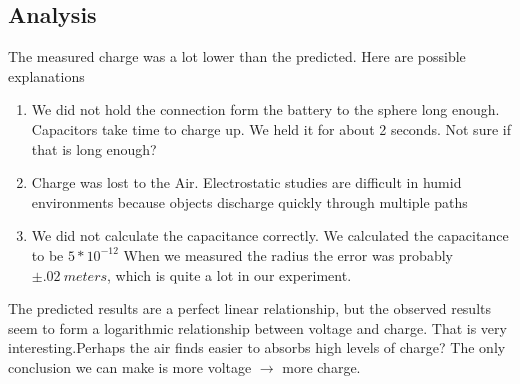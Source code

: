 \documentclass[12pt]{article}
\begin{document}
\subsection*{Analysis}
The measured charge was a lot lower than the predicted. Here are possible explanations
\begin{enumerate}
	\item 
	We did not hold the connection form the battery to the sphere long enough. Capacitors take time to charge up. We held it for about 2 seconds. Not sure if that is long enough?
	\item Charge was lost to the Air. Electrostatic studies are difficult in humid environments because objects discharge quickly through multiple paths 
	\item We did not calculate the capacitance correctly. We calculated the capacitance to be $5 * 10^{-12}$ When we measured the radius the error was probably $\pm .02 \ meters$, which is quite a lot in our experiment.
\end{enumerate}
The predicted results are a perfect linear relationship, but the observed results seem to form a logarithmic relationship between voltage and charge. That is very interesting.Perhaps the air finds easier to absorbs high levels of charge? The only conclusion we can make is more voltage $\rightarrow$ more charge.
\end{document}
